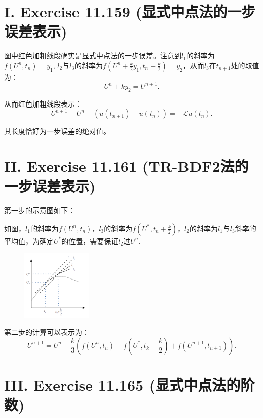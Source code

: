 \documentclass[twoside,a4paper]{article}
\begin{document}
\pagestyle{fancy}
\fancyhead{}

\section*{I. Exercise 11.159 (显式中点法的一步误差表示)}

\;\;\;\;\;\;图中红色加粗线段确实是显式中点法的一步误差。注意到$l_1$的斜率为$f(U^n,t_n)=y_1$, $l_2$与$l_3$的斜率为$f(U^n+\frac{k}{2}y_1,t_n+\frac{k}{2})=y_2$，从而$l_3$在$t_{n+1}$处的取值为：
\begin{equation*}
    U^n+ky_2=U^{n+1}.
\end{equation*}

从而红色加粗线段表示：
\begin{equation*}
    U^{n+1}-U^n-(u(t_{n+1})-u(t_n))=-\mathcal{L}u(t_n).
\end{equation*}

其长度恰好为一步误差的绝对值。

\section*{II. Exercise 11.161 (TR-BDF2法的一步误差表示)}

\;\;\;\;\;\;第一步的示意图如下：

如图，$l_1$的斜率为$f(U^n,t_n)$，$l_3$的斜率为$f(U^*,t_n+\frac{k}{2})$，$l_2$的斜率为$l_1$与$l_3$斜率的平均值，为确定$U^*$的位置，需要保证$l_2$过$U^n$.

\begin{figure}[H]
    \centering
    \includegraphics[width=0.3\textwidth]{figures/161-1.png}
\end{figure}

第二步的计算可以表示为：
\begin{equation*}
    U^{n+1}=U^n+\frac{k}{3}\left(f(U^n,t_n)+f(U^*,t_k+\frac{k}{2})+f(U^{n+1},t_{n+1})\right).
\end{equation*}

\section*{III. Exercise 11.165 (显式中点法的阶数)}
\end{document}
